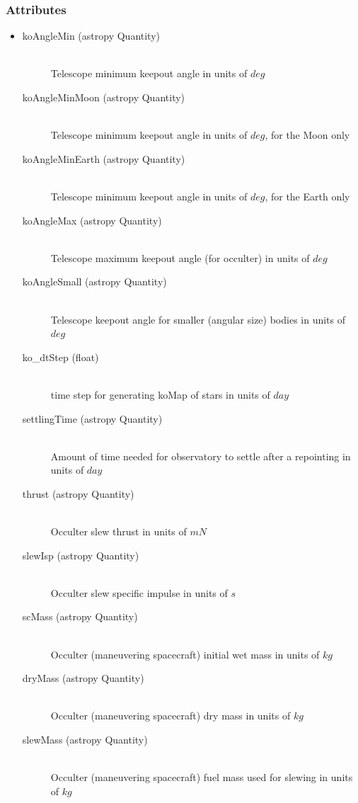 \documentclass[cleanfoot]{asme2ej}
\begin{document}
\subsubsection*{Attributes}
\begin{itemize}
\item
\begin{description}
    \item[koAngleMin (astropy Quantity)] \hfill \\ Telescope minimum keepout angle in units of $deg$
    \item[koAngleMinMoon (astropy Quantity)] \hfill \\ Telescope minimum keepout angle in units of $deg$, for the Moon only
    \item[koAngleMinEarth (astropy Quantity)] \hfill \\ Telescope minimum keepout angle in units of $deg$, for the Earth only
    \item[koAngleMax (astropy Quantity)] \hfill \\ Telescope maximum keepout angle (for occulter) in units of $deg$
    \item[koAngleSmall (astropy Quantity)] \hfill \\ Telescope keepout angle for smaller (angular size) bodies in units of $deg$
    \item[ko\_dtStep (float)] \hfill \\ time step for generating koMap of stars  in units of $ day $ 
    \item[settlingTime (astropy Quantity)] \hfill \\ Amount of time needed for observatory to settle after a repointing in units of $ day $
    \item[thrust (astropy Quantity)] \hfill \\ Occulter slew thrust in units of $ mN $
    \item[slewIsp (astropy Quantity)] \hfill \\ Occulter slew specific impulse in units of $ s $
    \item[scMass (astropy Quantity)] \hfill \\ Occulter (maneuvering spacecraft) initial wet mass in units of $ kg $
    \item[dryMass (astropy Quantity)] \hfill \\ Occulter (maneuvering spacecraft) dry mass in units of $ kg $
    \item[slewMass (astropy Quantity)] \hfill \\ Occulter (maneuvering spacecraft) fuel mass used for slewing in units of $ kg $

\end{description}
\end{itemize}
\end{document}
